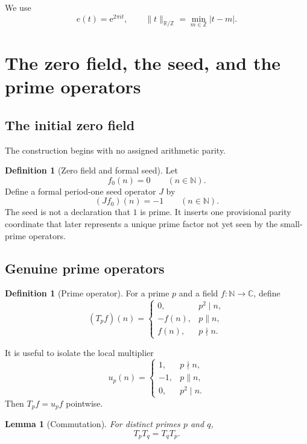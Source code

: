 \documentclass[11pt]{article}
\newtheorem{lemma}[theorem]{Lemma}
\theoremstyle{definition}
\newtheorem{definition}[theorem]{Definition}
\newcommand{\N}{\mathbb N}
\newcommand{\Z}{\mathbb Z}
\newcommand{\C}{\mathbb C}
\newcommand{\R}{\mathbb R}
\newcommand{\e}{\mathrm e}
\begin{document}
We use
\[
e(t)=\e^{2\pi i t},
\qquad
\|t\|_{\R/\Z}=\min_{m\in\Z}|t-m|.
\]

\section{The zero field, the seed, and the prime operators}

\subsection{The initial zero field}

The construction begins with no assigned arithmetic parity.

\begin{definition}[Zero field and formal seed]\label{def:seed}
Let
\[
f_0(n)=0\qquad(n\in\N).
\]
Define a formal period-one seed operator $J$ by
\[
(Jf_0)(n)=-1\qquad(n\in\N).
\]
The seed is not a declaration that $1$ is prime.  It inserts one provisional parity coordinate that later represents a unique prime factor not yet seen by the small-prime operators.
\end{definition}

\subsection{Genuine prime operators}

\begin{definition}[Prime operator]\label{def:prime-operator}
For a prime $p$ and a field $f:\N\to\C$, define
\[
(T_pf)(n)=
\begin{cases}
0,&p^2\mid n,\\
-f(n),&p\parallel n,\\
f(n),&p\nmid n.
\end{cases}
\]
\end{definition}

It is useful to isolate the local multiplier
\begin{equation}\label{eq:up-def}
u_p(n)=
\begin{cases}
1,&p\nmid n,\\
-1,&p\parallel n,\\
0,&p^2\mid n.
\end{cases}
\end{equation}
Then $T_pf=u_pf$ pointwise.

\begin{lemma}[Commutation]\label{lem:commutation}
For distinct primes $p$ and $q$,
\[
T_pT_q=T_qT_p.
\]
\end{lemma}
\end{document}
